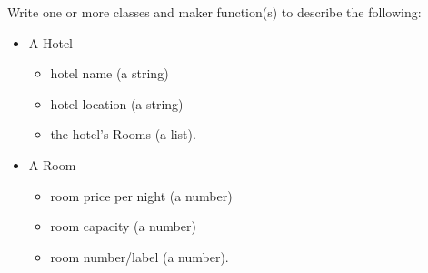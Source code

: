 Write one or more classes and maker function(s) to describe the following:\\
\begin{itemize}
	\item A Hotel
	\begin{itemize}
		\item hotel name (a string)
		\item hotel location (a string)
		\item the hotel's Rooms (a list). 
	\end{itemize}
	\item A Room
	\begin{itemize}
		\item room price per night (a number)
		\item room capacity (a number)
		\item room number/label (a number).
	\end{itemize}
\end{itemize}

\small
\begin{answer}
	
\end{answer}
\normalsize

\vspace{48pt}